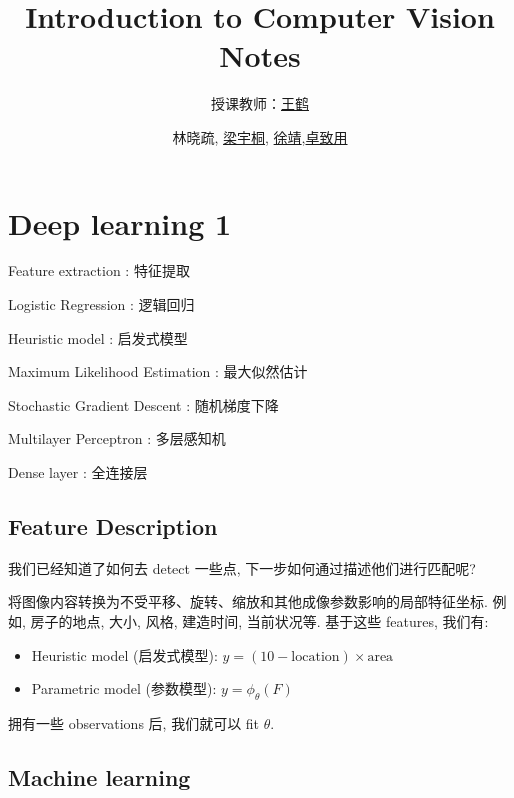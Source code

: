 \documentclass[lang=cn,10pt,green]{elegantbook}
\title{Introduction to Computer Vision Notes}
\subtitle{授课教师：\href{https://hughw19.github.io}{王鹤}}
\author{林晓疏, \href{https://lyt0112.com/}{梁宇桐}, \href{https://iculizhi.github.io/}{徐靖},\href{https://arthals.ink/}{卓致用}}
\institute{PKU EECS}
\begin{document}
\maketitle
\frontmatter

\tableofcontents

\mainmatter

\chapter{Deep learning 1}
\begin{introduction}[keywords]
    \item Feature extraction : 特征提取
    \item Logistic Regression : 逻辑回归
    \item Heuristic model : 启发式模型
    \item Maximum Likelihood Estimation : 最大似然估计
    \item Stochastic Gradient Descent : 随机梯度下降
    \item Multilayer Perceptron : 多层感知机
    \item Dense layer : 全连接层
\end{introduction}
\section{Feature Description}

\begin{problem}
    我们已经知道了如何去 detect 一些点, 下一步如何通过描述他们进行匹配呢?
\end{problem}

    将图像内容转换为不受平移、旋转、缩放和其他成像参数影响的局部特征坐标. 例如, 房子的地点, 大小, 风格, 建造时间, 当前状况等. 基于这些 features, 我们有:
    \begin{itemize}
        \item Heuristic model (启发式模型): $y = (10-\text{location})\times \text{area}$
        \item Parametric model (参数模型): $y = \phi_\theta(F)$
    \end{itemize}
\begin{note}
拥有一些 observations 后, 我们就可以 fit $\theta$.
\end{note}

\section{Machine learning}
\end{document}
